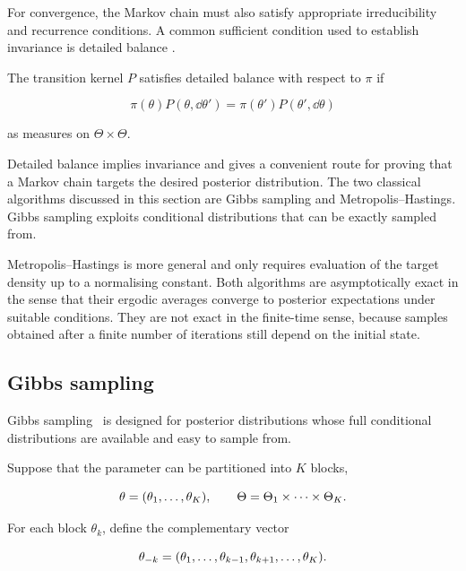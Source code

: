 For convergence, the Markov chain must also satisfy appropriate irreducibility and recurrence conditions.
A common sufficient condition used to establish invariance is detailed balance \cite{meyn2009}.

The transition kernel $P$ satisfies detailed balance with respect to $\pi$ if

\begin{equation}
    \pi(\theta)P(\theta,\dd\theta')
    =
    \pi(\theta')P(\theta',\dd\theta)
    \label{eq:detailed-balance-background}
\end{equation}

as measures on $\Theta\times\Theta$.

Detailed balance implies invariance and gives a convenient route for proving that a Markov chain targets the desired posterior distribution.
The two classical algorithms discussed in this section are Gibbs sampling and Metropolis--Hastings.
Gibbs sampling exploits conditional distributions that can be exactly sampled from.

Metropolis--Hastings is more general and only requires evaluation of the target density up to a normalising constant.
Both algorithms are asymptotically exact in the sense that their ergodic averages converge to posterior expectations under suitable conditions.
They are not exact in the finite-time sense, because samples obtained after a finite number of iterations still depend on the initial state.

\subsection{Gibbs sampling}

Gibbs sampling~\cite{geman1984, gelfand1990} is designed for posterior distributions whose full conditional distributions are available and easy to sample from.

Suppose that the parameter can be partitioned into $K$ blocks,

\begin{equation}
    \theta
    =
    \qty(\theta_1,\dots,\theta_K),
    \qquad
    \Theta
    =
    \Theta_1\times\cdots\times\Theta_K.
    \label{eq:gibbs-blocks-background}
\end{equation}

For each block $\theta_k$, define the complementary vector

\begin{equation}
    \theta_{-k}
    =
    \qty(\theta_1,\dots,\theta_{k-1},\theta_{k+1},\dots,\theta_K).
    \label{eq:gibbs-complement-background}
\end{equation}

